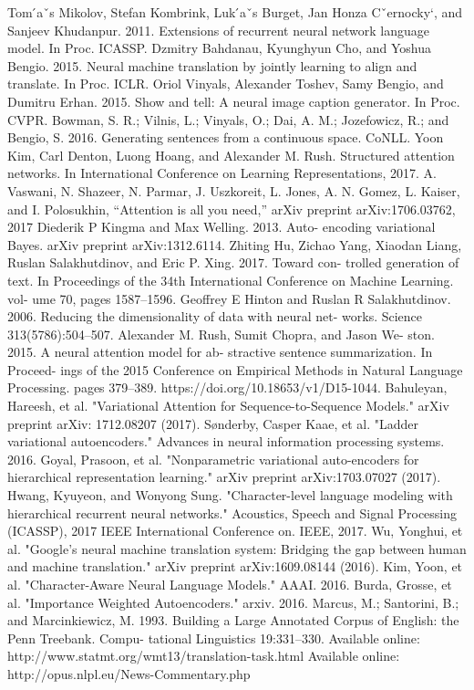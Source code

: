 \documentclass[journal, 12pt, draftcls, onecolumn]{IEEEtran}
\begin{document}
\begin{thebibliography}{20}
Tom ́aˇs Mikolov, Stefan Kombrink, Luk ́aˇs Burget, Jan Honza Cˇernocky`, and Sanjeev Khudanpur. 2011. Extensions of recurrent neural network language model. In Proc. ICASSP.
Dzmitry Bahdanau, Kyunghyun Cho, and Yoshua Bengio. 2015. Neural machine translation by jointly learning to align and translate. In Proc. ICLR.
Oriol Vinyals, Alexander Toshev, Samy Bengio, and Dumitru Erhan. 2015. Show and tell: A neural image caption generator. In Proc. CVPR.
Bowman, S. R.; Vilnis, L.; Vinyals, O.; Dai, A. M.; Jozefowicz, R.; and Bengio, S. 2016. Generating sentences from a continuous space. CoNLL.
Yoon Kim, Carl Denton, Luong Hoang, and Alexander M. Rush. Structured attention networks. In International Conference on Learning Representations, 2017.
A. Vaswani, N. Shazeer, N. Parmar, J. Uszkoreit, L. Jones, A. N. Gomez, L. Kaiser, and I. Polosukhin, “Attention is all you need,” arXiv preprint arXiv:1706.03762, 2017
Diederik P Kingma and Max Welling. 2013. Auto- encoding variational Bayes. arXiv preprint arXiv:1312.6114.
Zhiting Hu, Zichao Yang, Xiaodan Liang, Ruslan Salakhutdinov, and Eric P. Xing. 2017. Toward con- trolled generation of text. In Proceedings of the 34th International Conference on Machine Learning. vol- ume 70, pages 1587–1596.
Geoffrey E Hinton and Ruslan R Salakhutdinov. 2006. Reducing the dimensionality of data with neural net- works. Science 313(5786):504–507.
Alexander M. Rush, Sumit Chopra, and Jason We- ston. 2015. A neural attention model for ab- stractive sentence summarization. In Proceed- ings of the 2015 Conference on Empirical Methods in Natural Language Processing. pages 379–389. https://doi.org/10.18653/v1/D15-1044.
Bahuleyan, Hareesh, et al. "Variational Attention for Sequence-to-Sequence Models." arXiv preprint arXiv: 1712.08207 (2017).
Sønderby, Casper Kaae, et al. "Ladder variational autoencoders." Advances in neural information processing systems. 2016.
Goyal, Prasoon, et al. "Nonparametric variational auto-encoders for hierarchical representation learning." arXiv preprint arXiv:1703.07027 (2017).
Hwang, Kyuyeon, and Wonyong Sung. "Character-level language modeling with hierarchical recurrent neural networks." Acoustics, Speech and Signal Processing (ICASSP), 2017 IEEE International Conference on. IEEE,
2017.
Wu, Yonghui, et al. "Google's neural machine translation system: Bridging the gap between human and machine translation." arXiv preprint arXiv:1609.08144 (2016).
Kim, Yoon, et al. "Character-Aware Neural Language Models." AAAI. 2016.
Burda, Grosse, et al. "Importance Weighted Autoencoders." arxiv. 2016.
Marcus, M.; Santorini, B.; and Marcinkiewicz, M. 1993. Building a Large Annotated Corpus of English: the Penn Treebank. Compu- tational Linguistics 19:331–330.
Available online: http://www.statmt.org/wmt13/translation-task.html
Available online: http://opus.nlpl.eu/News-Commentary.php
\end{thebibliography}



\ifCLASSOPTIONcaptionsoff
  \newpage
\fi



\end{document}
